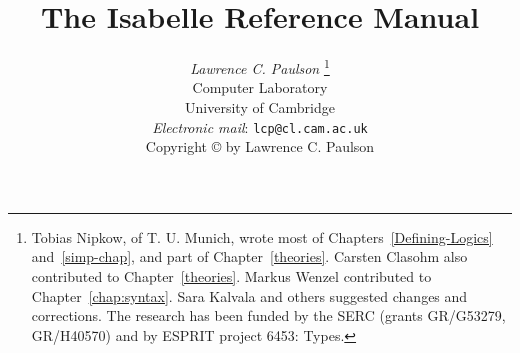 \title{The Isabelle Reference Manual}

\author{{\em Lawrence C. Paulson}%
\thanks{Tobias Nipkow, of T. U. Munich, wrote most of
  Chapters~\protect\ref{Defining-Logics} and~\protect\ref{simp-chap}, and part of
  Chapter~\protect\ref{theories}.  Carsten Clasohm also contributed to
  Chapter~\protect\ref{theories}.  Markus Wenzel contributed to
  Chapter~\protect\ref{chap:syntax}.  Sara Kalvala and others suggested changes
  and corrections.  The research has been funded by the SERC (grants
  GR/G53279, GR/H40570) and by ESPRIT project 6453: Types.}
\\
Computer Laboratory \\ University of Cambridge \\[2ex] 
\small{\em Electronic mail\/}: {\tt lcp@cl.cam.ac.uk}\\[3cm]
Copyright \copyright{} \number\year{} by Lawrence C. Paulson}

\date{} 
\makeindex

\underscoreoff

\setcounter{secnumdepth}{1} \setcounter{tocdepth}{2}

\pagestyle{headings}
\sloppy
\binperiod     %



\maketitle 
{} \tableofcontents \clearfirst














\begingroup
   \small\raggedright\frenchspacing
  
\endgroup




